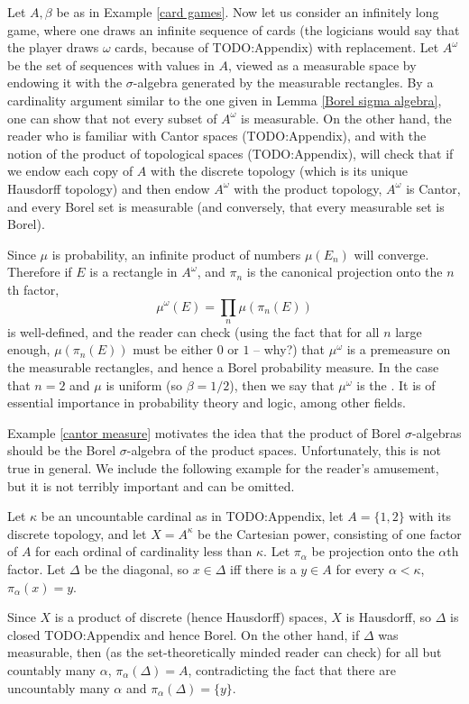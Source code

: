 \begin{example}
\label{cantor measure}
Let $A, \beta$ be as in Example \ref{card games}.
Now let us consider an infinitely long game, where one draws an infinite sequence of cards (the logicians would say that the player draws $\omega$ cards, because of TODO:Appendix) with replacement.
Let $A^\omega$ be the set of sequences with values in $A$, viewed as a measurable space by endowing it with the $\sigma$-algebra generated by the measurable rectangles.
By a cardinality argument similar to the one given in Lemma \ref{Borel sigma algebra}, one can show that not every subset of $A^\omega$ is measurable.
On the other hand, the reader who is familiar with Cantor spaces (TODO:Appendix), and with the notion of the product of topological spaces (TODO:Appendix), will check that if we endow each copy of $A$ with the discrete topology (which is its unique Hausdorff topology) and then endow $A^\omega$ with the product topology, $A^\omega$ is Cantor, and every Borel set is measurable (and conversely, that every measurable set is Borel).

Since $\mu$ is probability, an infinite product of numbers $\mu(E_{n})$ will converge. Therefore if $E$ is a rectangle in $A^\omega$, and $\pi_{n}$ is the canonical projection onto the $n$th factor,
\[\mu^\omega(E) = \prod_{n} \mu(\pi_{n}(E))\]
is well-defined, and the reader can check (using the fact that for all $n$ large enough, $\mu(\pi_{n}(E))$ must be either $0$ or $1$ -- why?) that $\mu^\omega$ is a premeasure on the measurable rectangles, and hence a Borel probability measure.
In the case that $n = 2$ and $\mu$ is uniform (so $\beta = 1/2$), then we say that $\mu^\omega$ is the .
It is of essential importance in probability theory and logic, among other fields.
\end{example}

Example \ref{cantor measure} motivates the idea that the product of Borel $\sigma$-algebras should be the Borel $\sigma$-algebra of the product spaces.
Unfortunately, this is not true in general.
We include the following example for the reader's amusement, but it is not terribly important and can be omitted.

\begin{example}
Let $\kappa$ be an uncountable cardinal as in TODO:Appendix, let $A = \{1, 2\}$ with its discrete topology, and let $X = A^\kappa$ be the Cartesian power, consisting of one factor of $A$ for each ordinal of cardinality less than $\kappa$. Let $\pi_\alpha$ be projection onto the $\alpha$th factor.
Let $\Delta$ be the diagonal, so $x \in \Delta$ iff there is a $y \in A$ for every $\alpha < \kappa$, $\pi_\alpha(x) = y$.

Since $X$ is a product of discrete (hence Hausdorff) spaces, $X$ is Hausdorff, so $\Delta$ is closed TODO:Appendix and hence Borel.
On the other hand, if $\Delta$ was measurable, then (as the set-theoretically minded reader can check) for all but countably many $\alpha$, $\pi_\alpha(\Delta) = A$, contradicting the fact that there are uncountably many $\alpha$ and $\pi_\alpha(\Delta) = \{y\}$.
\end{example}

